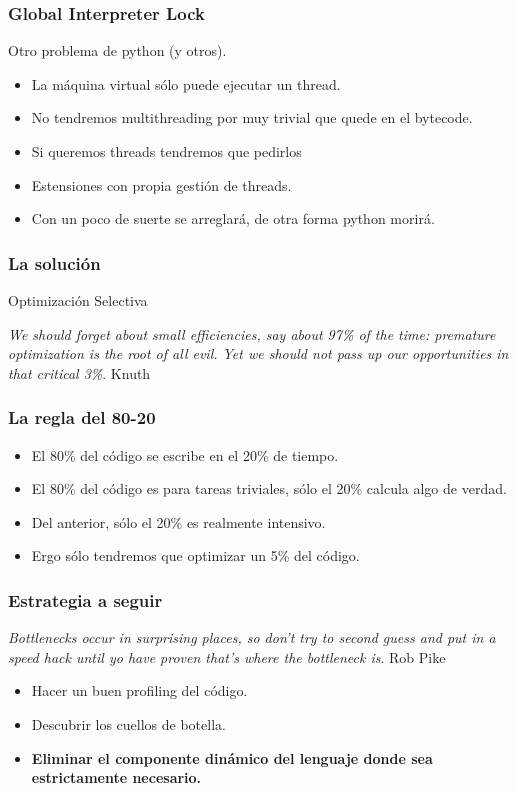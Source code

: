 \documentclass{beamer}
\begin{document}
\begin{frame}
  \frametitle{Global Interpreter Lock}
  Otro problema de python (y otros).
  \begin{itemize}
  \item La máquina virtual sólo puede ejecutar un thread.
  \item No tendremos multithreading por muy trivial que quede en el
    bytecode.
  \item Si queremos threads tendremos que pedirlos
  \item Estensiones con propia gestión de threads.
  \item Con un poco de suerte se arreglará, de otra forma python
    morirá.
  \end{itemize}
\end{frame}

\begin{frame}
  \frametitle{La solución}
  \begin{center}
    \begin{Huge}
      Optimización Selectiva
    \end{Huge}
  \end{center}
  \vspace{1cm}
  \begin{flushright}
    \textit{We should forget about small efficiencies, say about 97\%
      of the time: premature optimization is the root of all evil. Yet
      we should not pass up our opportunities in that critical 3\%}. Knuth
  \end{flushright}
\end{frame}

\begin{frame}
  \frametitle{La regla del 80-20}
  \begin{itemize}
  \item El 80\% del código se escribe en el 20\% de tiempo.
  \item El 80\% del código es para tareas triviales, sólo el 20\%
    calcula algo de verdad.
  \item Del anterior, sólo el 20\% es realmente intensivo.
  \item Ergo sólo tendremos que optimizar un 5\% del código.
  \end{itemize}
\end{frame}

\begin{frame}
  \frametitle{Estrategia a seguir}
  \begin{flushright}
    \textit{Bottlenecks occur in surprising places, so don't try to
      second guess and put in a speed hack until yo have proven that's
      where the bottleneck is}. Rob Pike
  \end{flushright}
  \vspace{1cm}
  \begin{itemize}
  \item Hacer un buen profiling del código.
  \item Descubrir los cuellos de botella.
  \item \textbf{Eliminar el componente dinámico del lenguaje donde sea
    estrictamente necesario.}
  \end{itemize}
\end{frame}
\end{document}
